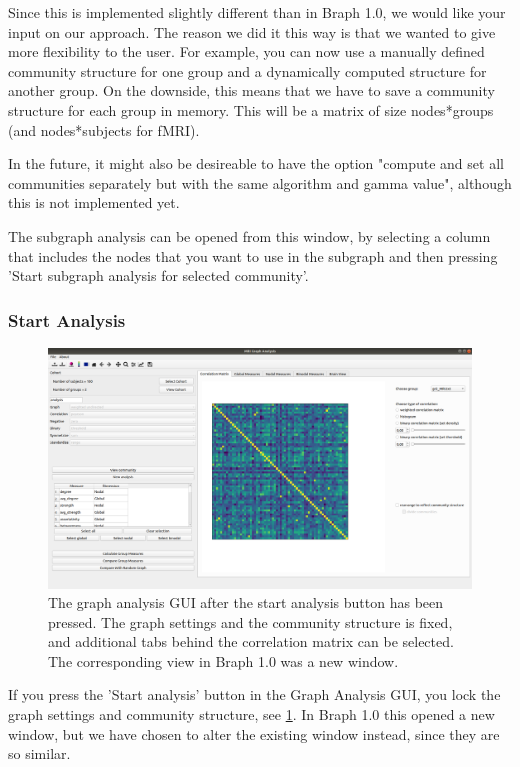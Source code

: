 \documentclass{article}
\begin{document}
Since this is implemented slightly different than in Braph 1.0, we would like your input on our approach. The reason we did it this way is that we wanted to give more flexibility to the user. For example, you can now use a manually defined community structure for one group and a dynamically computed structure for another group. On the downside, this means that we have to save a community structure for each group in memory. This will be a matrix of size nodes*groups (and nodes*subjects for fMRI).

In the future, it might also be desireable to have the option "compute and set all communities separately but with the same algorithm and gamma value", although this is not implemented yet.

The subgraph analysis can be opened from this window, by selecting a column that includes the nodes that you want to use in the subgraph and then pressing 'Start subgraph analysis for selected community'.

\subsubsection{Start Analysis}
\label{sec:start_analysis}

\begin{figure}[h]
    \centering
    \includegraphics[width=\linewidth]{start_analysis.png}
    \caption{The graph analysis GUI after the start analysis button has been pressed. The graph settings and the community structure is fixed, and additional tabs behind the correlation matrix can be selected. The corresponding view in Braph 1.0 was a new window.}
    \label{fig:start_analysis}
\end{figure}

If you press the 'Start analysis' button in the Graph Analysis GUI, you lock the graph settings and community structure, see \cref{fig:start_analysis}. In Braph 1.0 this opened a new window, but we have chosen to alter the existing window instead, since they are so similar. 
\end{document}

